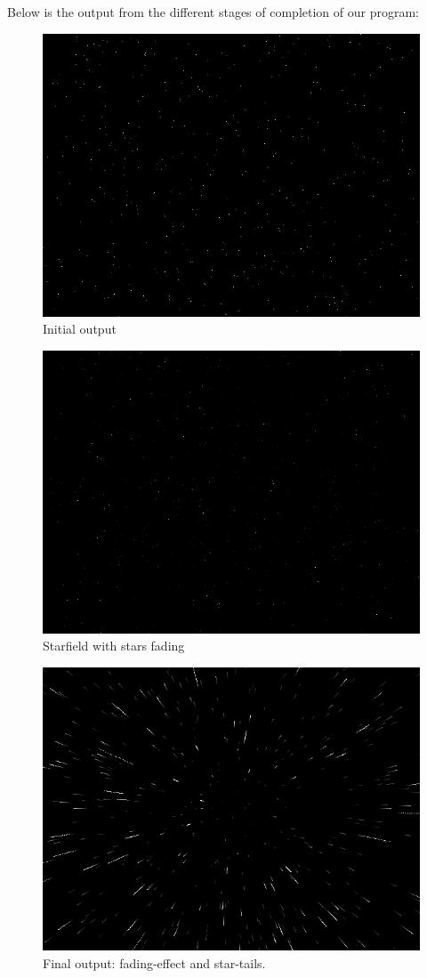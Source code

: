 \documentclass[a4paper,11pt]{article}
\begin{document}
Below is the output from the different stages of completion of our program:
\begin{figure}[h!]
	\centering
	\includegraphics[width=0.75\linewidth]{screenshot2.png}
	\caption{Initial output}
	\label{fig1}
\end{figure}
\begin{figure}[h!]
	\centering
	\includegraphics[width=0.75\linewidth]{screenshot3.png}
	\caption{Starfield with stars fading}
	\label{fig1}
\end{figure}
\begin{figure}[h!]
	\centering
	\includegraphics[width=0.75\linewidth]{screenshot4.png}
	\caption{Final output: fading-effect and star-tails.}
	\label{fig1}
\end{figure}
\end{document}
